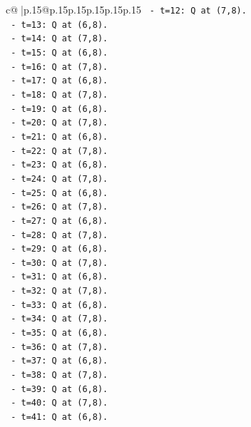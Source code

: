 \documentclass{article}
\begin{document}
{\begin{supertabular}{c@{$\;$}|p{.15\linewidth}@{}p{.15\linewidth}p{.15\linewidth}p{.15\linewidth}p{.15\linewidth}p{.15\linewidth}}
{{{\texttt{            {-}   t=12: Q at (7,8).} \\
\texttt{            {-}   t=13: Q at (6,8).} \\
\texttt{            {-}   t=14: Q at (7,8).} \\
\texttt{            {-}   t=15: Q at (6,8).} \\
\texttt{            {-}   t=16: Q at (7,8).} \\
\texttt{            {-}   t=17: Q at (6,8).} \\
\texttt{            {-}   t=18: Q at (7,8).} \\
\texttt{            {-}   t=19: Q at (6,8).} \\
\texttt{            {-}   t=20: Q at (7,8).} \\
\texttt{            {-}   t=21: Q at (6,8).} \\
\texttt{            {-}   t=22: Q at (7,8).} \\
\texttt{            {-}   t=23: Q at (6,8).} \\
\texttt{            {-}   t=24: Q at (7,8).} \\
\texttt{            {-}   t=25: Q at (6,8).} \\
\texttt{            {-}   t=26: Q at (7,8).} \\
\texttt{            {-}   t=27: Q at (6,8).} \\
\texttt{            {-}   t=28: Q at (7,8).} \\
\texttt{            {-}   t=29: Q at (6,8).} \\
\texttt{            {-}   t=30: Q at (7,8).} \\
\texttt{            {-}   t=31: Q at (6,8).} \\
\texttt{            {-}   t=32: Q at (7,8).} \\
\texttt{            {-}   t=33: Q at (6,8).} \\
\texttt{            {-}   t=34: Q at (7,8).} \\
\texttt{            {-}   t=35: Q at (6,8).} \\
\texttt{            {-}   t=36: Q at (7,8).} \\
\texttt{            {-}   t=37: Q at (6,8).} \\
\texttt{            {-}   t=38: Q at (7,8).} \\
\texttt{            {-}   t=39: Q at (6,8).} \\
\texttt{            {-}   t=40: Q at (7,8).} \\
\texttt{            {-}   t=41: Q at (6,8).} \\
}}}
\end{supertabular}}
\end{document}
